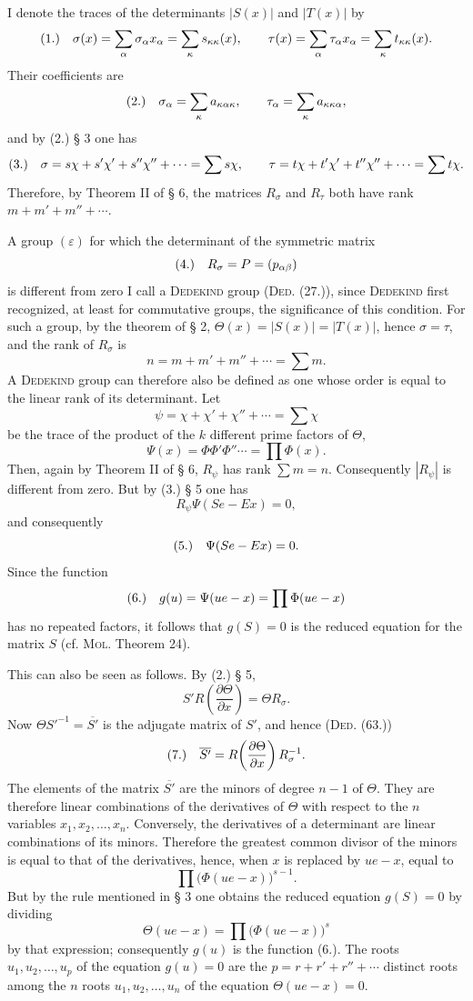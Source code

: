 \documentclass[11pt]{article}
\newcommand{\eps}{\varepsilon}
\newcommand{\fnum}[1]{\textup{(\ensuremath{#1}.)}\quad}
\begin{document}
I denote the traces of the determinants $|S(x)|$ and $|T(x)|$ by
\[
\fnum{1} \sigma(x)=\sum_\alpha \sigma_\alpha x_\alpha=\sum_\kappa s_{\kappa\kappa}(x),\qquad
\tau(x)=\sum_\alpha \tau_\alpha x_\alpha=\sum_\kappa t_{\kappa\kappa}(x).
\]
Their coefficients are
\[
\fnum{2} \sigma_\alpha=\sum_\kappa a_{\kappa\alpha\kappa},\qquad
\tau_\alpha=\sum_\kappa a_{\kappa\kappa\alpha},
\]
and by (2.) § 3 one has
\[
\fnum{3} \sigma=s\chi+s'\chi'+s''\chi''+\cdots=\sum s\chi,
\qquad
\tau=t\chi+t'\chi'+t''\chi''+\cdots=\sum t\chi.
\]
Therefore, by Theorem II of § 6, the matrices $R_\sigma$ and $R_\tau$ both have rank $m+m'+m''+\cdots$.

A group $(\eps)$ for which the determinant of the symmetric matrix
\[
\fnum{4} R_\sigma=P=(p_{\alpha\beta})
\]
is different from zero I call a \textsc{Dedekind} group (\textsc{Ded}. (27.)), since \textsc{Dedekind} first recognized, at least for commutative groups, the significance of this condition. For such a group, by the theorem of § 2, $\Theta(x)=|S(x)|=|T(x)|$, hence $\sigma=\tau$, and the rank of $R_\sigma$ is
\[
 n=m+m'+m''+\cdots=\sum m.
\]
A \textsc{Dedekind} group can therefore also be defined as one whose order is equal to the linear rank of its determinant. Let
\[
 \psi=\chi+\chi'+\chi''+\cdots=\sum\chi
\]
be the trace of the product of the $k$ different prime factors of $\Theta$,
\[
 \Psi(x)=\Phi\Phi'\Phi''\cdots=\prod\Phi(x).
\]
Then, again by Theorem II of § 6, $R_\psi$ has rank $\sum m=n$. Consequently $|R_\psi|$ is different from zero. But by (3.) § 5 one has
\[
 R_\psi\Psi(Se-Ex)=0,
\]
and consequently
\[
\fnum{5} \Psi(Se-Ex)=0.
\]
Since the function
\[
\fnum{6} g(u)=\Psi(ue-x)=\prod\Phi(ue-x)
\]
has no repeated factors, it follows that $g(S)=0$ is the reduced equation for the matrix $S$ (cf. \textsc{Mol}. Theorem 24).

This can also be seen as follows. By (2.) § 5,
\[
 S'R\!\left(\frac{\partial\Theta}{\partial x}\right)=\Theta R_\sigma.
\]
Now $\Theta S'^{-1}=\overline{S'}$ is the adjugate matrix of $S'$, and hence (\textsc{Ded}. (63.))
\[
\fnum{7} \overline{S'}=R\!\left(\frac{\partial\Theta}{\partial x}\right)R_\sigma^{-1}.
\]
The elements of the matrix $\overline{S'}$ are the minors of degree $n-1$ of $\Theta$. They are therefore linear combinations of the derivatives of $\Theta$ with respect to the $n$ variables $x_1,x_2,\ldots,x_n$. Conversely, the derivatives of a determinant are linear combinations of its minors. Therefore the greatest common divisor of the minors is equal to that of the derivatives, hence, when $x$ is replaced by $ue-x$, equal to
\[
 \prod\bigl(\Phi(ue-x)\bigr)^{s-1}.
\]
But by the rule mentioned in § 3 one obtains the reduced equation $g(S)=0$ by dividing
\[
 \Theta(ue-x)=\prod\bigl(\Phi(ue-x)\bigr)^s
\]
by that expression; consequently $g(u)$ is the function (6.). The roots $u_1,u_2,\ldots,u_p$ of the equation $g(u)=0$ are the $p=r+r'+r''+\cdots$ distinct roots among the $n$ roots $u_1,u_2,\ldots,u_n$ of the equation $\Theta(ue-x)=0$.
\end{document}
